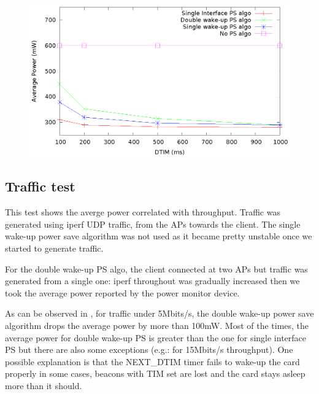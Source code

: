 \begin{figure}
\includegraphics{src/img/notraffic.eps}
\label{img:notraffic}
\end{figure}

\subsection{Traffic test}
\label{sub-sec:traffic}

This test shows the averge power correlated with throughput. Traffic was generated using iperf UDP traffic, from the APs towards the client. The single wake-up power save algorithm was not used as it became pretty unstable once we started to generate traffic.

For the double wake-up PS algo, the client connected at two APs but traffic was generated from a single one: iperf throughout was gradually increased then we took the average power reported by the power monitor device.

As can be observed in , for traffic under 5Mbits/s, the double wake-up power save algorithm drops the average power by more than 100mW. Most of the times, the average power for double wake-up PS is greater than the one for single interface PS but there are also some exceptions (e.g.: for 15Mbits/s throughput). One possible explanation is that the NEXT_DTIM timer fails to wake-up the card properly in some cases, beacons with TIM set are lost and the card stays asleep more than it should.

